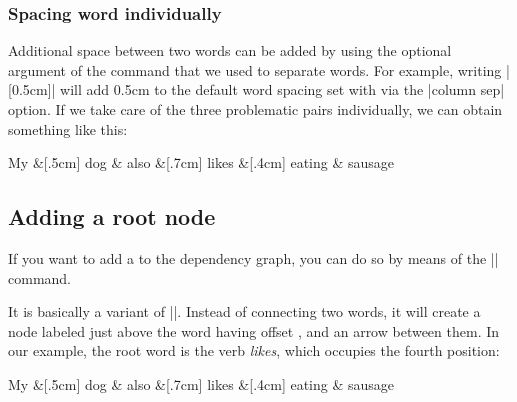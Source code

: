 \documentclass[a4paper]{ltxdoc}
\newcommand{\cmdname}[1]{\texttt{\color{red!75!black}\detokenize{#1}}}
\newcommand{\options}[1][key-value-pairs]{\opt{\oarg{#1}}}
\begin{document}
\subsubsection{Spacing word individually}

Additional space between two words can be added by using the optional argument of the \cmdname{\&} command that we used to separate words. For example, writing \cmdname{\&}|[0.5cm]| will add 0.5cm to the default word spacing set with via the |column sep| option. If we take care of the three problematic pairs individually, we can obtain something like this:

\begin{codeexample}[]
\begin{dependency}
   \begin{deptext}[column sep=0.2cm]
      My \&[.5cm] dog \& also \&[.7cm] likes \&[.4cm] eating \& sausage \\
   \end{deptext}
\end{dependency}
\end{codeexample}

\subsection{Adding a root node}

If you want to add a  to the dependency graph, you can do so by means of the |\deproot| command.

\begin{command}{\deproot\options{}}
   It is basically a variant of |\depedge|. Instead of connecting two words, it will create a node labeled  just above the word having offset , and an arrow between them. In our example, the root word is the verb \emph{likes}, which occupies the fourth position:
\end{command}

\begin{codeexample}[]
\begin{dependency}
   \begin{deptext}[column sep=0.2cm]
      My \&[.5cm] dog \& also \&[.7cm] likes \&[.4cm] eating \& sausage \\
   \end{deptext}
\end{dependency}
\end{codeexample}
\end{document}
